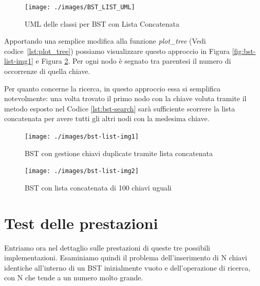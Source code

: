 \documentclass{article}
\begin{document}
\vspace{15px}


\begin{figure}[H]
  \centering
  \texttt{[image: ./images/BST\_LIST\_UML]}
    \caption{UML delle classi per BST con Lista Concatenata}
  \label{fig:BST_LIST_UML}
\end{figure}

\vspace{15px}

Apportando una semplice modifica alla funzione \textit{plot\_tree} (Vedi codice~\ref{lst:plot_tree}) possiamo visualizzare questo approccio in Figura \ref{fig:bst-list-img1} e Figura \ref{fig:bst-list-img2}.
Per ogni nodo è segnato tra parentesi il numero di occorrenze di quella chiave.

Per quanto concerne la ricerca, in questo approccio essa si semplifica notevolmente:
una volta trovato il primo nodo con la chiave voluta tramite il metodo esposto nel Codice \ref{lst:bst-search} sarà sufficiente scorrere la lista concatenata per avere tutti gli altri nodi con la medesima chiave.


\begin{figure}[htbp]
    \centering
  \begin{minipage}{0.48\textwidth}  %
    \centering
    \texttt{[image: ./images/bst-list-img1]}
    \caption{BST con gestione chiavi duplicate tramite lista concatenata}
    \label{fig:bst-list-img1}
  \end{minipage}%
  \hfill  %
  \begin{minipage}{0.48\textwidth}  %
    \centering
    \texttt{[image: ./images/bst-list-img2]}
    \caption{BST con lista concatenata di 100 chiavi uguali}
    \label{fig:bst-list-img2}
  \end{minipage}
\end{figure}




\section{Test delle prestazioni}
Entriamo ora nel dettaglio sulle prestazioni di queste tre possibili implementazioni.
Esaminiamo quindi il problema dell'inserimento di N chiavi identiche all'interno di un BST inizialmente vuoto e dell'operazione di ricerca, con N che tende a un numero molto grande.
\end{document}
